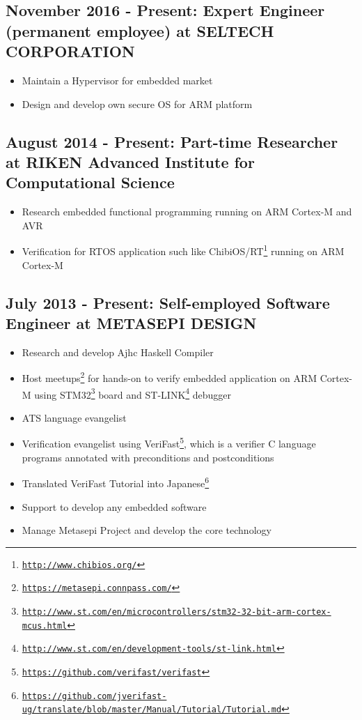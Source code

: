 \documentclass[letterpaper]{article}
\begin{document}
\subsection*{November 2016 - Present: Expert Engineer (permanent employee) at SELTECH CORPORATION}

\begin{itemize}
  \item Maintain a Hypervisor for embedded market
  \item Design and develop own secure OS for ARM platform
\end{itemize}

\subsection*{August 2014 - Present: Part-time Researcher at RIKEN Advanced Institute for Computational Science}

\begin{itemize}
  \item Research embedded functional programming running on ARM Cortex-M and AVR
  \item Verification for RTOS application such like ChibiOS/RT\footnote{\href{http://www.chibios.org/}{\tt http://www.chibios.org/}} running on ARM Cortex-M
\end{itemize}

\subsection*{July 2013 - Present: Self-employed Software Engineer at METASEPI DESIGN}

\begin{itemize}
  \item Research and develop Ajhc Haskell Compiler
  \item Host meetups\footnote{\href{https://metasepi.connpass.com/}{\tt https://metasepi.connpass.com/}} for hands-on to verify embedded application on ARM Cortex-M using STM32\footnote{\href{http://www.st.com/en/microcontrollers/stm32-32-bit-arm-cortex-mcus.html}{\tt http://www.st.com/en/microcontrollers/stm32-32-bit-arm-cortex-mcus.html}} board and ST-LINK\footnote{\href{http://www.st.com/en/development-tools/st-link.html}{\tt http://www.st.com/en/development-tools/st-link.html}} debugger
  \item ATS language evangelist
  \item Verification evangelist using VeriFast\footnote{\href{https://github.com/verifast/verifast}{\tt https://github.com/verifast/verifast}}, which is a verifier C language programs annotated with preconditions and postconditions
  \item Translated VeriFast Tutorial into Japanese\footnote{\href{https://github.com/jverifast-ug/translate/blob/master/Manual/Tutorial/Tutorial.md}{\tt https://github.com/jverifast-ug/translate/blob/master/Manual/Tutorial/Tutorial.md}}
  \item Support to develop any embedded software
  \item Manage Metasepi Project and develop the core technology
\end{itemize}
\end{document}
